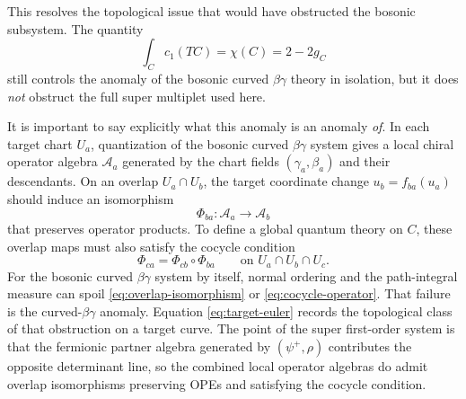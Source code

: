 \documentclass[11pt]{article}
\newcommand{\mc}[1]{\mathcal{#1}}
\begin{document}
This resolves the topological issue that would have obstructed the bosonic subsystem. The quantity
\begin{equation}\label{eq:target-euler}
\int_C c_1(TC)=\chi(C)=2-2g_C
\end{equation}
still controls the anomaly of the bosonic curved $\beta\gamma$ theory in isolation, but it does \emph{not} obstruct the full super multiplet used here.

It is important to say explicitly what this anomaly is an anomaly \emph{of}. In each target chart $U_a$, quantization of the bosonic curved $\beta\gamma$ system gives a local chiral operator algebra $\mc A_a$ generated by the chart fields $(\gamma_a,\beta_a)$ and their descendants. On an overlap $U_a\cap U_b$, the target coordinate change $u_b=f_{ba}(u_a)$ should induce an isomorphism
\begin{equation}\label{eq:overlap-isomorphism}
\Phi_{ba}:\mc A_a\longrightarrow \mc A_b
\end{equation}
that preserves operator products. To define a global quantum theory on $C$, these overlap maps must also satisfy the cocycle condition
\begin{equation}\label{eq:cocycle-operator}
\Phi_{ca}=\Phi_{cb}\circ \Phi_{ba}
\qquad\text{on }U_a\cap U_b\cap U_c.
\end{equation}
For the bosonic curved $\beta\gamma$ system by itself, normal ordering and the path-integral measure can spoil \eqref{eq:overlap-isomorphism} or \eqref{eq:cocycle-operator}. That failure is the curved-$\beta\gamma$ anomaly. Equation \eqref{eq:target-euler} records the topological class of that obstruction on a target curve. The point of the super first-order system is that the fermionic partner algebra generated by $(\psi^+,\rho)$ contributes the opposite determinant line, so the combined local operator algebras do admit overlap isomorphisms preserving OPEs and satisfying the cocycle condition.
\end{document}
